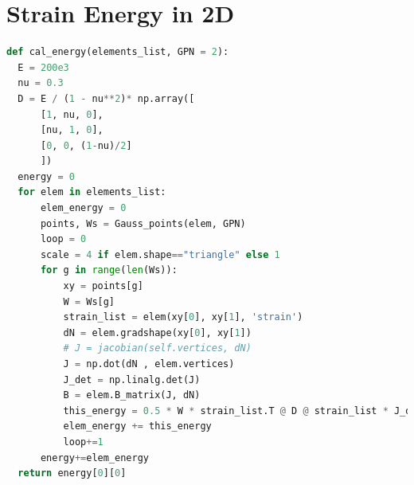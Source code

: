 \documentclass[twoside,twocolumn,10pt]{article}
\begin{document}
\section{Strain Energy in 2D}
\label{Apdx:energy}
\begin{lstlisting}[language=Python, caption=Strain energy in 2D]
def cal_energy(elements_list, GPN = 2):
  E = 200e3
  nu = 0.3
  D = E / (1 - nu**2)* np.array([
      [1, nu, 0],
      [nu, 1, 0],
      [0, 0, (1-nu)/2]
      ])
  energy = 0
  for elem in elements_list:
      elem_energy = 0
      points, Ws = Gauss_points(elem, GPN)
      loop = 0
      scale = 4 if elem.shape=="triangle" else 1
      for g in range(len(Ws)):
          xy = points[g]
          W = Ws[g]
          strain_list = elem(xy[0], xy[1], 'strain')
          dN = elem.gradshape(xy[0], xy[1])
          # J = jacobian(self.vertices, dN)
          J = np.dot(dN , elem.vertices)
          J_det = np.linalg.det(J)
          B = elem.B_matrix(J, dN)
          this_energy = 0.5 * W * strain_list.T @ D @ strain_list * J_det #* scale
          elem_energy += this_energy 
          loop+=1
      energy+=elem_energy
  return energy[0][0]
\end{lstlisting}





 
\end{document}
